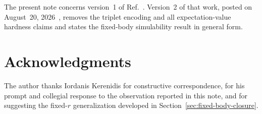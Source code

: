 \documentclass[10pt,twocolumn]{article}
\theoremstyle{plain}
\begin{document}
The present note concerns version~1 of
Ref.~\cite{Kerenidis2026v1}. Version~2 of that work, posted on August~20, 2026~\cite{Kerenidis2026v2}, removes the triplet encoding and all
expectation-value hardness claims and states the fixed-body
simulability result in general form.

\section*{Acknowledgments}

The author thanks Iordanis Kerenidis for constructive correspondence,
for his prompt and collegial response to the observation reported in
this note, and for suggesting the fixed-\(r\) generalization developed
in Section~\ref{sec:fixed-body-closure}.


{\small

}
\end{document}
